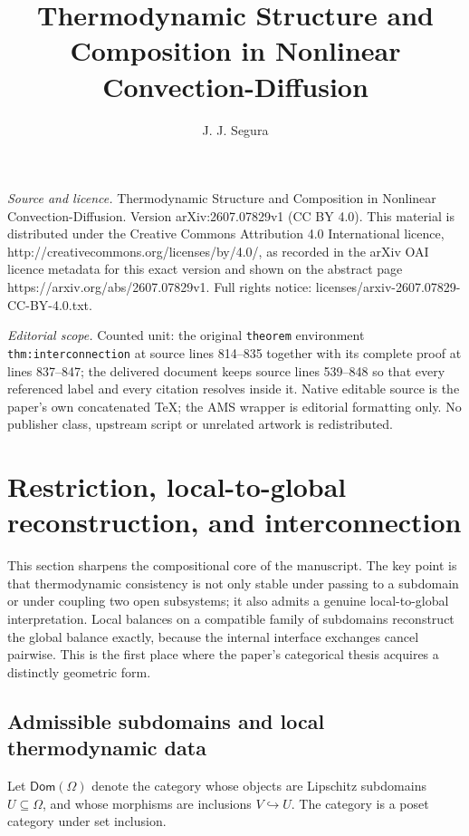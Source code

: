 \documentclass[10pt,a4paper]{amsart}
\newcommand{\Om}{\Omega}
\begin{document}
\title[Thermodynamic Structure and Composition in Nonlinear Convect]{Thermodynamic Structure and Composition in Nonlinear Convection-Diffusion}
\author{J. J. Segura}
\date{}
\maketitle
\noindent\emph{Source and licence.} Thermodynamic Structure and Composition in Nonlinear Convection-Diffusion. Version arXiv:2607.07829v1 (CC BY 4.0). This material is distributed under the Creative Commons Attribution 4.0 International licence, http://creativecommons.org/licenses/by/4.0/, as recorded in the arXiv OAI licence metadata for this exact version and shown on the abstract page https://arxiv.org/abs/2607.07829v1. Full rights notice: licenses/arxiv-2607.07829-CC-BY-4.0.txt.\par\smallskip
\noindent\textit{Editorial scope.} Counted unit: the original \texttt{theorem} environment \texttt{thm:interconnection} at source lines 814--835 together with its complete proof at lines 837--847; the delivered document keeps source lines 539--848 so that every referenced label and every citation resolves inside it. Native editable source is the paper's own concatenated TeX; the AMS wrapper is editorial formatting only. No publisher class, upstream script or unrelated artwork is redistributed.
\section{Restriction, local-to-global reconstruction, and interconnection}

This section sharpens the compositional core of the manuscript. The key point is that
thermodynamic consistency is not only stable under passing to a subdomain or under
coupling two open subsystems; it also admits a genuine local-to-global
interpretation. Local balances on a compatible family of subdomains reconstruct the
global balance exactly, because the internal interface exchanges cancel pairwise.
This is the first place where the paper's categorical thesis acquires a distinctly
geometric form.

\subsection{Admissible subdomains and local thermodynamic data}

Let \(\mathsf{Dom}(\Om)\) denote the category whose objects are Lipschitz subdomains
\(U\subseteq \Om\), and whose morphisms are inclusions \(V\hookrightarrow U\). The
category is a poset category under set inclusion.
\end{document}
